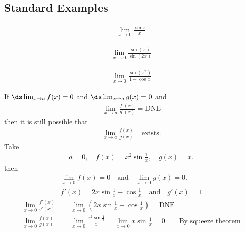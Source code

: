 \subsection{Standard Examples}\label{ssec_3_7_1}
\begin{eg}\label{eg:hopitalA}
\begin{align*}
\lim_{x\to 0} \frac{\sin x}{x}
\end{align*}
\end{eg}
\begin{eg}\label{eg:hopitalB}
\begin{align*}
\lim_{x\to 0} \frac{\sin(x)}{\sin(2x)}
\end{align*}
\end{eg}
\begin{eg}\label{eg:hopitalC}
\begin{align*}
\lim_{x\to 0} \frac{\sin(x^2)}{1-\cos x}
\end{align*}
\end{eg}
\begin{warning}\label{warning:lhopital3}
If $\ds\lim_{x\to a}f(x) = 0$ and $\ds\lim_{x\to a}g(x) = 0$ and
\begin{align*}
\lim\limits_{x\to a}\frac{f'(x)}{g'(x)} = \text{DNE}
\end{align*}
then it is still possible that
\begin{align*}
\lim\limits_{x\to a}\frac{f(x)}{g(x)} & \text{ exists.}
\end{align*}
Take
\begin{align*}
a=0,\quad f(x)=x^2\sin\frac{1}{x}, \quad g(x)= x.
\end{align*}
then
\begin{gather*}
\lim_{x\to 0} f(x) = 0\quad\text{and}\quad\lim_{x\to 0} g(x) = 0. \\
f'(x) = 2x\sin\frac{1}{x} -\cos\frac{1}{x}\quad\text{and}\quad g'(x) = 1
\end{gather*}
\begin{align*}
\lim_{x\to 0} \frac{f'(x)}{g'(x)} &= \lim_{x\to 0} \left( 2x\sin\frac{1}{x} -\cos\frac{1}{x}\right) = \text{DNE} \\
\lim_{x\to 0}\frac{f(x)}{g(x)} &= \lim_{x\to 0}\frac{x^2\sin\frac{1}{x}}{x} =\lim_{x\to 0} x\sin\frac{1}{x}= 0\qquad\text{By squeeze theorem}
\end{align*}
\end{warning}
